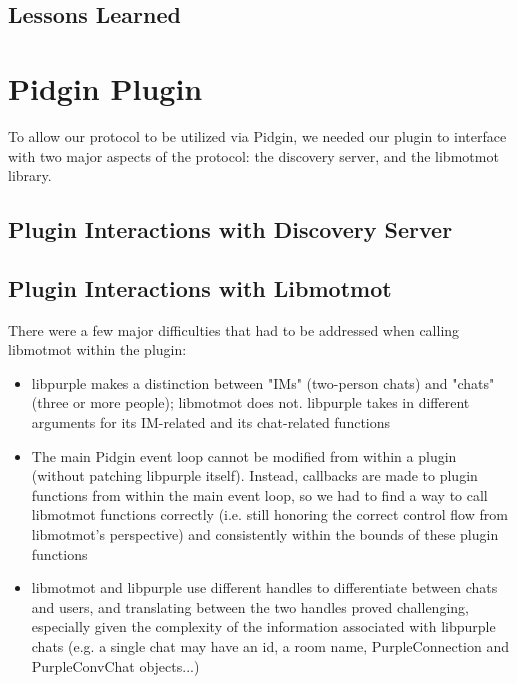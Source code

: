 \documentclass{sig-alternate}
\begin{document}
\subsection{Lessons Learned}


\section{Pidgin Plugin}

To allow our protocol to be utilized via Pidgin, we needed our plugin to interface with two major aspects of the protocol: the discovery server, and the libmotmot library.

\subsection{Plugin Interactions with Discovery Server}

\subsection{Plugin Interactions with Libmotmot}
There were a few major difficulties that had to be addressed when calling libmotmot within the plugin:

\begin{itemize}
\item libpurple makes a distinction between "IMs" (two-person chats) and "chats" (three or more people); libmotmot does not.  libpurple takes in different arguments for its IM-related and its chat-related functions

\item The main Pidgin event loop cannot be modified from within a plugin (without patching libpurple itself).  Instead, callbacks are made to plugin functions from within the main event loop, so we had to find a way to call libmotmot functions correctly (i.e. still honoring the correct control flow from libmotmot's perspective) and consistently within the bounds of these plugin functions

\item libmotmot and libpurple use different handles to differentiate between chats and users, and translating between the two handles proved challenging, especially given the complexity of the information associated with libpurple chats (e.g. a single chat may have an id, a room name, PurpleConnection and PurpleConvChat objects...)

\end{itemize}
\end{document}
